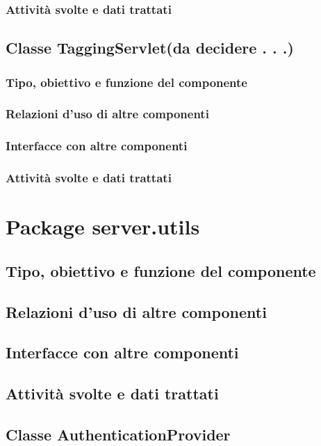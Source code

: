 \subsubsection*{Attivit\`a svolte e dati trattati}

\newpage
\subsection{Classe TaggingServlet(da decidere . . .)}
\subsubsection*{Tipo, obiettivo e funzione del componente}
\subsubsection*{Relazioni d'uso di altre componenti}
\subsubsection*{Interfacce con altre componenti}
\subsubsection*{Attivit\`a svolte e dati trattati}

\section{Package server.utils} %
\subsection*{Tipo, obiettivo e funzione del componente}
\subsection*{Relazioni d'uso di altre componenti}
\subsection*{Interfacce con altre componenti}
\subsection*{Attivit\`a svolte e dati trattati}

\subsection{Classe AuthenticationProvider}

